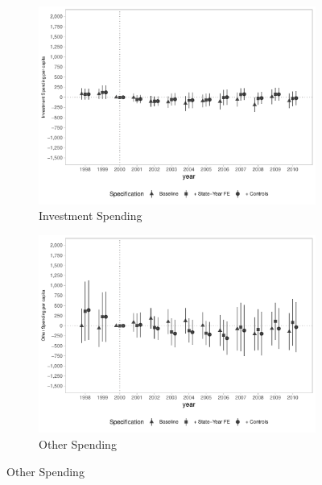 \begin{figure}[h]
\begin{center}
\begin{subfigure}{0.49\textwidth}
    \end{subfigure}
    \begin{subfigure}{0.49\textwidth}
        \centering
        \caption{\scriptsize Investment Spending}\label{fig:finbra1_c}
        \includegraphics[width=\textwidth]{plots/spending/finbra_desp_investimento_pcapita_dist_ec29_baseline_dist_ec29_baseline_full.pdf}
    \end{subfigure}
    \begin{subfigure}{0.49\textwidth}
        \centering
        \caption{\scriptsize Other Spending}\label{fig:finbra1_d}
        \includegraphics[width=\textwidth]{plots/spending/finbra_desp_outros_nature_pcapita_dist_ec29_baseline_dist_ec29_baseline_full.pdf}
    \end{subfigure}
    
    \end{center}
    
\end{figure}


